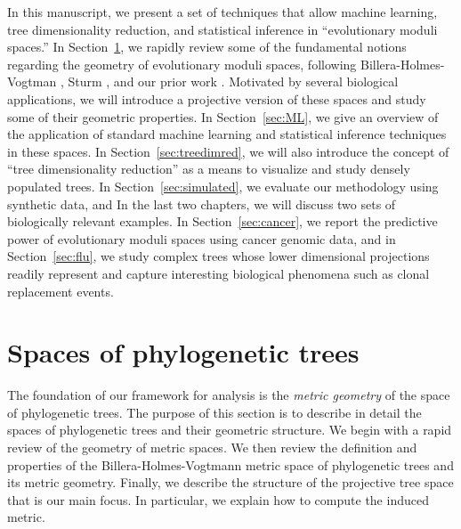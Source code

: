 \documentclass[a4paper,11pt]{article}
\begin{document}
In this manuscript,  we present a set of techniques that allow machine learning, tree dimensionality reduction, and statistical inference in ``evolutionary moduli  spaces.''
In Section~\ref{sec:phylospace}, we rapidly review some of the fundamental notions regarding the geometry of evolutionary moduli spaces, following Billera-Holmes-Vogtman \cite{billera2001geometry}, Sturm \cite{sturm2003probability}, and our prior work \cite{zairis2014moduli}. 
Motivated by several biological applications, we will introduce a projective version of these spaces and study some of their geometric properties.
In Section~\ref{sec:ML}, we give an overview of the application of standard machine learning and statistical inference techniques in these spaces. 
In Section~\ref{sec:treedimred}, we will also introduce the concept of ``tree dimensionality reduction'' as a means to visualize and study densely populated trees. 
In Section~\ref{sec:simulated}, we evaluate our methodology using synthetic data, and In the last two chapters, we will discuss two sets of biologically relevant examples.
In Section~\ref{sec:cancer}, we report the predictive power of evolutionary moduli spaces using cancer genomic data, and in Section~\ref{sec:flu}, we study complex trees whose lower dimensional projections readily represent and capture interesting biological phenomena such as clonal replacement events.


\section{Spaces of phylogenetic trees}\label{sec:phylospace}

The foundation of our framework for analysis is the {\em metric geometry} of the space of phylogenetic trees.
The purpose of this section is to describe in detail the spaces of phylogenetic trees and their geometric structure.
We begin with a rapid review of the geometry of metric spaces.
We then review the definition and properties of the Billera-Holmes-Vogtmann metric space of phylogenetic trees and its metric geometry.
Finally, we describe the structure of the projective tree space that is our main focus.
In particular, we explain how to compute the induced metric.
\end{document}
